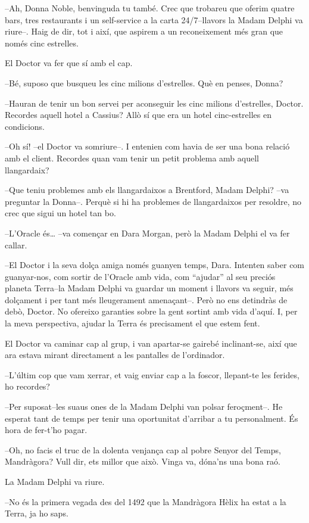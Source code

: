 --Ah, Donna Noble, benvinguda tu també. Crec que trobareu que oferim
quatre bars, tres restaurants i un self-service a la carta 24/7--llavors
la Madam Delphi va riure--. Haig de dir, tot i així, que aspirem a un
reconeixement més gran que només cinc estrelles.

El Doctor va fer que sí amb el cap.

--Bé, suposo que busqueu les cinc milions d'estrelles. Què en penses,
Donna?

--Hauran de tenir un bon servei per aconseguir les cinc milions
d'estrelles, Doctor. Recordes aquell hotel a Cassius? Allò sí que era un
hotel cinc-estrelles en condicions.

--Oh sí! --el Doctor va somriure--. I entenien com havia de ser una bona
relació amb el client. Recordes quan vam tenir un petit problema amb
aquell llangardaix?

--Que teniu problemes amb els llangardaixos a Brentford, Madam Delphi?
--va preguntar la Donna--. Perquè si hi ha problemes de llangardaixos
per resoldre, no crec que sigui un hotel tan bo.

--L'Oracle és\ldots{} --va començar en Dara Morgan, però la Madam Delphi
el va fer callar.

--El Doctor i la seva dolça amiga només guanyen temps, Dara. Intenten
saber com guanyar-nos, com sortir de l'Oracle amb vida, com ``ajudar''
al seu preciós planeta Terra--la Madam Delphi va guardar un moment i
llavors va seguir, més dolçament i per tant més lleugerament
amenaçant--. Però no ens detindràs de debò, Doctor. No ofereixo
garanties sobre la gent sortint amb vida d'aquí. I, per la meva
perspectiva, ajudar la Terra és precisament el que estem fent.

El Doctor va caminar cap al grup, i van apartar-se gairebé inclinant-se,
així que ara estava mirant directament a les pantalles de l'ordinador.

--L'últim cop que vam xerrar, et vaig enviar cap a la foscor, llepant-te
les ferides, ho recordes?

--Per suposat--les suaus ones de la Madam Delphi van polsar feroçment--.
He esperat tant de temps per tenir una oportunitat d'arribar a tu
personalment. És hora de fer-t'ho pagar.

--Oh, no facis el truc de la dolenta venjança cap al pobre Senyor del
Temps, Mandràgora? Vull dir, ets millor que això. Vinga va, dóna'ns una
bona raó.

La Madam Delphi va riure.

--No és la primera vegada des del 1492 que la Mandràgora Hèlix ha estat
a la Terra, ja ho saps.

